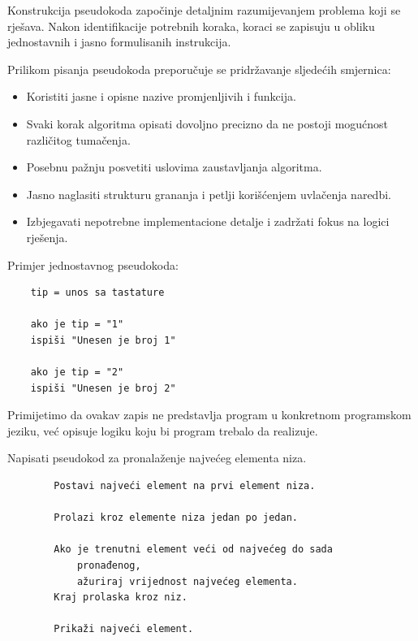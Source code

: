 Konstrukcija pseudokoda započinje detaljnim razumijevanjem problema koji se rješava. Nakon identifikacije potrebnih koraka, koraci se zapisuju u obliku jednostavnih i jasno formulisanih instrukcija.

Prilikom pisanja pseudokoda preporučuje se pridržavanje sljedećih smjernica:

\begin{itemize}
	\item Koristiti jasne i opisne nazive promjenljivih i funkcija.
	
	\item Svaki korak algoritma opisati dovoljno precizno da ne postoji mogućnost različitog tumačenja.
	
	\item Posebnu pažnju posvetiti uslovima zaustavljanja algoritma.
	
	\item Jasno naglasiti strukturu grananja i petlji korišćenjem uvlačenja naredbi.
	
	\item Izbjegavati nepotrebne implementacione detalje i zadržati fokus na logici rješenja.
	
\end{itemize}

Primjer jednostavnog pseudokoda:

\begin{verbatim}
	tip = unos sa tastature
	
	ako je tip = "1"
	ispiši "Unesen je broj 1"
	
	ako je tip = "2"
	ispiši "Unesen je broj 2"
\end{verbatim}

Primijetimo da ovakav zapis ne predstavlja program u konkretnom programskom jeziku, već opisuje logiku koju bi program trebalo da realizuje.

\begin{example}
	Napisati pseudokod za pronalaženje najvećeg elementa niza.
	
	\begin{verbatim}
		Postavi najveći element na prvi element niza.
		
		Prolazi kroz elemente niza jedan po jedan.
		
		Ako je trenutni element veći od najvećeg do sada 
	        pronađenog,
		    ažuriraj vrijednost najvećeg elementa.
		Kraj prolaska kroz niz.
		
		Prikaži najveći element.
	\end{verbatim}
	
\end{example}

